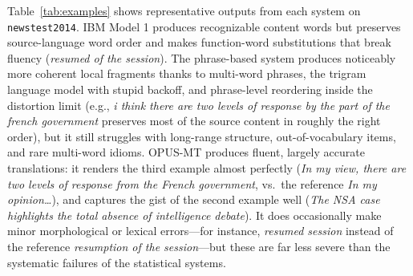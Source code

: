 \documentclass[11pt]{article}
\begin{document}
Table~\ref{tab:examples} shows representative outputs from each system on \texttt{newstest2014}. IBM Model 1 produces recognizable content words but preserves source-language word order and makes function-word substitutions that break fluency (\emph{resumed of the session}). The phrase-based system produces noticeably more coherent local fragments thanks to multi-word phrases, the trigram language model with stupid backoff, and phrase-level reordering inside the distortion limit (e.g., \emph{i think there are two levels of response by the part of the french government} preserves most of the source content in roughly the right order), but it still struggles with long-range structure, out-of-vocabulary items, and rare multi-word idioms. OPUS-MT produces fluent, largely accurate translations: it renders the third example almost perfectly (\emph{In my view, there are two levels of response from the French government}, vs.\ the reference \emph{In my opinion\ldots}), and captures the gist of the second example well (\emph{The NSA case highlights the total absence of intelligence debate}). It does occasionally make minor morphological or lexical errors---for instance, \emph{resumed session} instead of the reference \emph{resumption of the session}---but these are far less severe than the systematic failures of the statistical systems.
\end{document}
